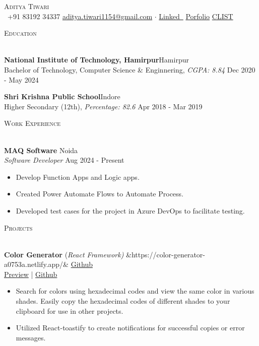 \documentclass[10pt]{article}
\newcommand{\bulletSep} { \vspace{2.2mm} }
\newcommand{\sectionSep} { \vspace{3mm} }
\newcommand{\lineunder} {
    \vspace*{-8pt} \\
    \hspace*{-15pt} \hrulefill \\
}
\newcommand{\header} [1] {
    {\hspace*{-18pt}\vspace*{6pt} {
        \fontfamily{qcs}\selectfont \large \scshape #1
    }}
    \vspace*{-6pt} \lineunder
    \vspace{0.5mm}
}
\newcommand{\educationItem}[5]{
    \textbf{#1}\hfill #2\\
    #3, \textit{#4} \hfill #5\\
}
\newcommand{\experienceItem}[5]{
    \textbf{#1} \hfill #2 \\
    \textit{#3} \hfill #4 \\
    \begin{itemize}
        #5
    \end{itemize}
}
\newcommand{\projectItem}[5]{
    {\textbf{#1}} {(\sl #2)}\hfill
    \ifx&#3&%
    \href{#4}{Github}\\
    \else
    \href{#3}{Preview} | \href{#4}{Github}\\
    \fi
    \begin{itemize}
        #5
    \end{itemize}
}
\begin{document}

\begin{center}
    {\Huge \scshape {}\selectfont Aditya Tiwari}\\
    \vspace{0.5mm}
    \faPhone~+91 83192 34337
    \href{mailto: aditya.tiwari1154@gmail.com}{\color{black}aditya.tiwari1154@gmail.com}
    $\cdot$
    \href{https://www.linkedin.com/in/aditya-tiwari-438087203/}{\color{black}Linked\faLinkedinSquare~}
    \href{https://aditya-tiwari-portfolio.netlify.app/}{\color{black}Porfolio\faGlobe}
    \href{https://clist.by/coder/Valier/}{\color{black} CLIST}
\end{center}

\vspace{-2mm}


\header{Education}

\educationItem{National Institute of Technology, Hamirpur}{Hamirpur}{Bachelor of Technology, Computer Science \& Enginnering}{CGPA: 8.84}{Dec 2020 - May 2024}
\bulletSep

\educationItem{Shri Krishna Public School}{Indore}{Higher Secondary (12th)}{Percentage: 82.6}{Apr 2018 - Mar 2019}
\sectionSep


\header{Work Experience}

\experienceItem{MAQ Software}{Noida}{Software Developer}{Aug 2024 - Present}{
    \item Develop Function Apps and Logic apps.
    \item Created Power Automate Flows to Automate Process.
    \item Developed test cases for the project in Azure DevOps to facilitate testing.
}
\bulletSep
\sectionSep


\header{Projects}

\projectItem{Color Generator}{React Framework}{https://color-generator-a0753a.netlify.app/}{https://github.com/devloper016/Color-Generator}{
    \item Search for colors using hexadecimal codes and view the same color in various shades. Easily copy the hexadecimal codes of different shades to your clipboard for use in other projects.
   
   \item Utilized React-toastify to create notifications for successful copies or error messages.
}
\bulletSep
\end{document}

